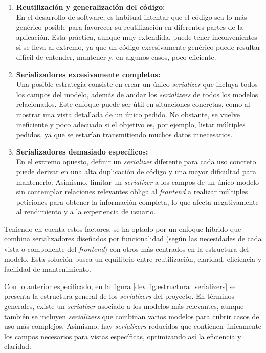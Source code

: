 \begin{enumerate}
    \item \textbf{Reutilización y generalización del código:} \\
          En el desarrollo de software, es habitual intentar que el código sea lo más genérico posible para favorecer su reutilización en diferentes partes de la aplicación. Esta práctica, aunque muy extendida, puede tener inconvenientes si se lleva al extremo, ya que un código excesivamente genérico puede resultar difícil de entender, mantener y, en algunos casos, poco eficiente.
    \item \textbf{Serializadores excesivamente completos:} \\
          Una posible estrategia consiste en crear un único \textit{serializer} que incluya todos los campos del modelo, además de anidar los \textit{serializers} de todos los modelos relacionados. Este enfoque puede ser útil en situaciones concretas, como al mostrar una vista detallada de un único pedido. No obstante, se vuelve ineficiente y poco adecuado si el objetivo es, por ejemplo, listar múltiples pedidos, ya que se estarían transmitiendo muchos datos innecesarios.
    \item \textbf{Serializadores demasiado específicos:} \\
          En el extremo opuesto, definir un \textit{serializer} diferente para cada uso concreto puede derivar en una alta duplicación de código y una mayor dificultad para mantenerlo. Asimismo, limitar un \textit{serializer} a los campos de un único modelo sin contemplar relaciones relevantes obliga al \textit{frontend} a realizar múltiples peticiones para obtener la información completa, lo que afecta negativamente al rendimiento y a la experiencia de usuario.
\end{enumerate}

Teniendo en cuenta estos factores, se ha optado por un enfoque híbrido que combina serializadores diseñados por funcionalidad (según las necesidades de cada vista o componente del \textit{frontend}) con otros más centrados en la estructura del modelo. Esta solución busca un equilibrio entre reutilización, claridad, eficiencia y facilidad de mantenimiento.

Con lo anterior especificado, en la figura \ref{dev:fig:estructura_serializers} se presenta la estructura general de los \textit{serializers} del proyecto. En términos generales, existe un \textit{serializer} asociado a los modelos más relevantes, aunque también se incluyen \textit{serializers} que combinan varios modelos para cubrir casos de uso más complejos. Asimismo, hay \textit{serializers} reducidos que contienen únicamente los campos necesarios para vistas específicas, optimizando así la eficiencia y claridad.

